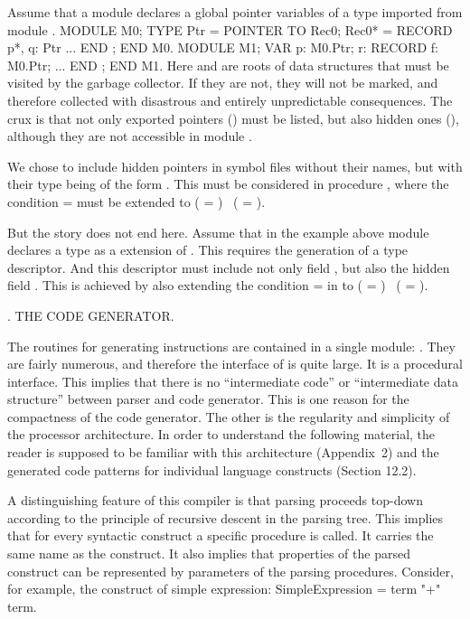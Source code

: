 Assume that a module  declares a global pointer variables of a type imported from module .
\begintt
MODULE M0;
TYPE Ptr = POINTER TO Rec0;
Rec0* = RECORD p*, q: Ptr ... END ; END M0.
MODULE M1; VAR p: M0.Ptr;
r: RECORD f: M0.Ptr; ... END ; END M1.
\endtt
Here  and  are roots of data structures that must be visited by the garbage collector. If they are not, they will not be marked, and therefore collected with disastrous and entirely unpredictable consequences. The crux is that not only exported pointers () must be listed, but also hidden ones (), although they are not accessible in module .

We chose to include hidden pointers in symbol files without their names, but with their type being of the form . This must be considered in procedure , where the condition  =  must be extended to ( = ) \lor\ ( = ).

But the story does not end here. Assume that in the example above module  declares a type  as a  extension of . This requires the generation of a type descriptor. And this descriptor must include not only field , but also the hidden field . This is achieved by also extending the condition  =  in  to ( = ) \lor\ ( = ).

. THE CODE GENERATOR.

The routines for generating instructions are contained in a single module: . They are fairly numerous, and therefore the interface of  is quite large. It is a procedural interface. This implies that there is no ``intermediate code'' or ``intermediate data structure'' between parser and code generator. This is one reason for the compactness of the code generator. The other is the regularity and simplicity of the processor architecture. In order to understand the following material, the reader is supposed to be familiar with this architecture (Appendix~2) and the generated code patterns for individual language constructs (Section 12.2).

A distinguishing feature of this compiler is that parsing proceeds top-down according to the principle of recursive descent in the parsing tree. This implies that for every syntactic construct a specific procedure is called. It carries the same name as the construct. It also implies that properties of the parsed construct can be represented by parameters of the parsing procedures. Consider, for example, the construct of simple expression:
\begintt
  SimpleExpression = term {"+" term}.
\endtt

